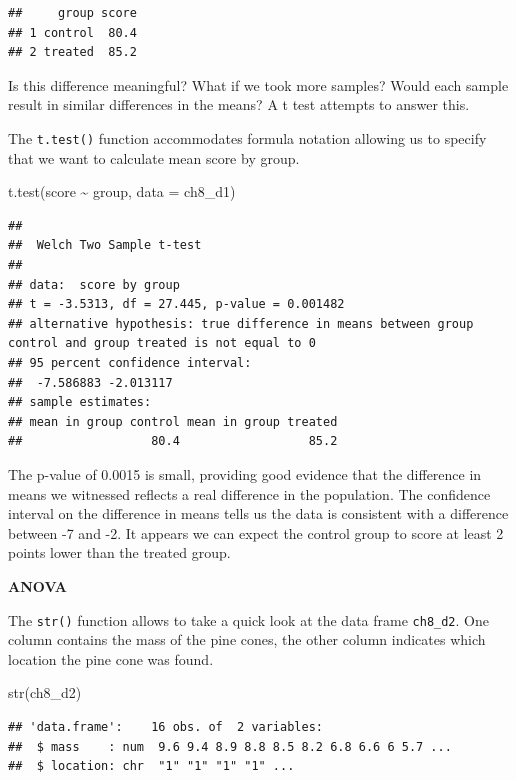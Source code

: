 \documentclass[
]{book}
\newenvironment{Shaded}{\begin{snugshade}}{\end{snugshade}}
\newcommand{\AttributeTok}[1]{\textcolor[rgb]{0.77,0.63,0.00}{#1}}
\newcommand{\FunctionTok}[1]{\textcolor[rgb]{0.00,0.00,0.00}{#1}}
\newcommand{\NormalTok}[1]{#1}
\newcommand{\SpecialCharTok}[1]{\textcolor[rgb]{0.00,0.00,0.00}{#1}}
\begin{document}
\begin{verbatim}
##     group score
## 1 control  80.4
## 2 treated  85.2
\end{verbatim}

Is this difference meaningful? What if we took more samples? Would each sample result in similar differences in the means? A t test attempts to answer this.

The \texttt{t.test()} function accommodates formula notation allowing us to specify that we want to calculate mean score by group.

\begin{Shaded}
\begin{Highlighting}[]
\FunctionTok{t.test}\NormalTok{(score }\SpecialCharTok{\textasciitilde{}}\NormalTok{ group, }\AttributeTok{data =}\NormalTok{ ch8\_d1)}
\end{Highlighting}
\end{Shaded}

\begin{verbatim}
## 
##  Welch Two Sample t-test
## 
## data:  score by group
## t = -3.5313, df = 27.445, p-value = 0.001482
## alternative hypothesis: true difference in means between group control and group treated is not equal to 0
## 95 percent confidence interval:
##  -7.586883 -2.013117
## sample estimates:
## mean in group control mean in group treated 
##                  80.4                  85.2
\end{verbatim}

The p-value of 0.0015 is small, providing good evidence that the difference in means we witnessed reflects a real difference in the population. The confidence interval on the difference in means tells us the data is consistent with a difference between -7 and -2. It appears we can expect the control group to score at least 2 points lower than the treated group.

\textbf{ANOVA}

The \texttt{str()} function allows to take a quick look at the data frame \texttt{ch8\_d2}. One column contains the mass of the pine cones, the other column indicates which location the pine cone was found.

\begin{Shaded}
\begin{Highlighting}[]
\FunctionTok{str}\NormalTok{(ch8\_d2)}
\end{Highlighting}
\end{Shaded}

\begin{verbatim}
## 'data.frame':    16 obs. of  2 variables:
##  $ mass    : num  9.6 9.4 8.9 8.8 8.5 8.2 6.8 6.6 6 5.7 ...
##  $ location: chr  "1" "1" "1" "1" ...
\end{verbatim}
\end{document}
